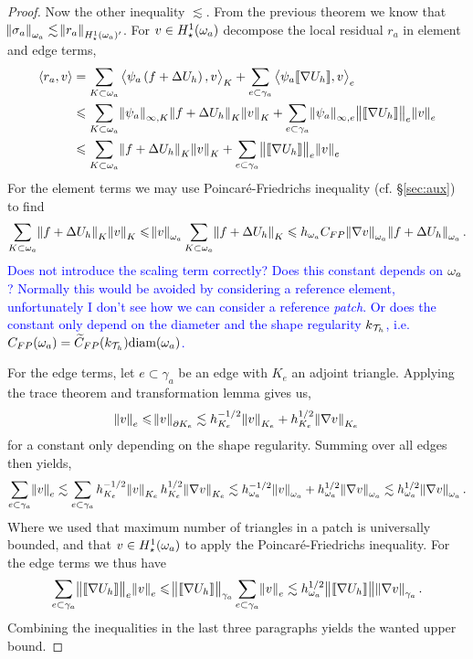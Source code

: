 \documentclass[thesis.tex]{subfiles}
\begin{document}
\begin{proof}
  Now the other inequality $\lesssim$. From the previous theorem we know that $\norm{\sigma_a}_{\omega_a} \lesssim \norm{r_a}_{H_\star^1(\omega_a)'}$. For $v \in H_\star^1(\omega_a)$ decompose the local residual $r_a$ in element and edge terms,
  \begin{align*}
    \left \langle r_a, v \right \rangle &= \sum_{K \subset \omega_a} \left \langle \psi_a\left(f + \Delta U_h\right), v \right \rangle_{K} + \sum_{e \subset \gamma_a} \left \langle \psi_a \llbracket \nabla U_h \rrbracket, v \right \rangle_e\\
    &\leqslant \sum_{K \subset \omega_a} \norm{\psi_a}_{\infty,K} \norm{f + \Delta U_h}_{K}\norm{v}_{K} + \sum_{e \subset \gamma_a} \norm{\psi_a}_{\infty, e} \norm{ \llbracket \nabla U_h \rrbracket}_e \norm{v}_e\\
    &\leqslant \sum_{K \subset \omega_a} \norm{f + \Delta U_h}_{K}\norm{v}_{K} + \sum_{e \subset \gamma_a} \norm{ \llbracket \nabla U_h \rrbracket}_e \norm{v}_e
  \end{align*}
  For the element terms we may use Poincar\'e-Friedrichs inequality (cf. \S\ref{sec:aux}) to find
  \[
    \sum_{K \subset \omega_a} \norm{f + \Delta U_h}_{K} \norm{v}_K \leqslant \norm{v}_{\omega_a} \sum_{K\subset \omega_a} \norm{f + \Delta U_h}_{K} \leqslant 
    h_{\omega_a} C_{FP} \norm{\nabla v}_{\omega_a} \norm{f + \Delta U_h}_{\omega_a}.
  \]
  \textcolor{blue}{Does not introduce the scaling term correctly? Does this constant depends on $\omega_a$? Normally this would be avoided
  by considering a reference element, unfortunately I don't see how we can consider a reference \emph{patch}.
  Or does the constant only depend on the diameter and the shape regularity $k_{\mathcal{T}_h}$,
  i.e. $C_{FP}(\omega_a) = \widetilde{C}_{FP}(k_{\mathcal{T}_h})\text{diam}(\omega_a)$.}

  For the edge terms, let $e \subset \gamma_a$ be an edge with $K_e$ an adjoint triangle. Applying the trace theorem and transformation lemma
  gives us,
  \[ 
    \norm{v}_e \leqslant \norm{v}_{\partial K_e} \lesssim h_{K_e}^{-1/2} \norm{v}_{K_e} + h_{K_e}^{1/2} \norm{\nabla v}_{K_e}
  \]
  for a constant only depending on the shape regularity. 
  Summing over all edges then yields,
  \[
    \sum_{e \subset \gamma_a} \norm{v}_e \lesssim \sum_{e\subset \gamma_a}h_{K_e}^{-1/2} \norm{v}_{K_e} h_{K_e}^{1/2} \norm{\nabla v}_{K_e}
    \lesssim h_{\omega_a}^{-1/2} \norm{v}_{\omega_a} + h_{\omega_a}^{1/2} \norm{\nabla v}_{\omega_a} \lesssim h_{\omega_a}^{1/2} \norm{\nabla v}_{\omega_a}.
  \]
  Where we used that maximum number of triangles in a patch is universally bounded, and that $v \in H_\star^1(\omega_a)$ to apply the
  Poincar\'e-Friedrichs inequality. For the edge terms we thus have
  \[
    \sum_{e \subset \gamma_a} \norm{ \llbracket \nabla U_h \rrbracket}_e \norm{v}_e \leqslant \norm{\llbracket \nabla U_h \rrbracket}_{\gamma_a} \sum_{e \subset \gamma_a} \norm{v}_e \lesssim h_{\omega_a}^{1/2} \norm{\llbracket \nabla U_h \rrbracket}  \norm{\nabla v}_{\gamma_a}. 
  \]
  Combining the inequalities in the last three paragraphs yields the wanted upper bound.
\end{proof}
\end{document}
